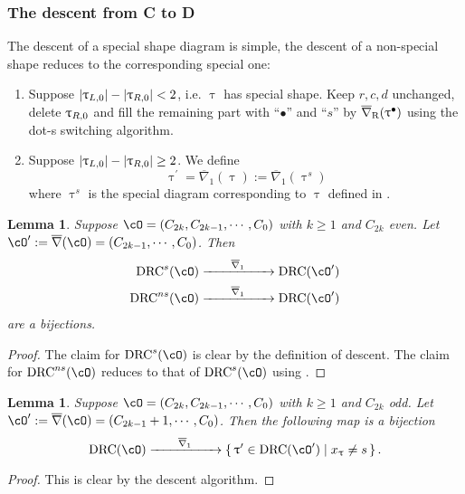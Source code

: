 \documentclass[12pt,a4paper]{amsart}
\def\abs#1{\left|{#1}\right|}
\def\eDD{\overline{\nabla}}
\def\eDDo{\overline{\nabla}_1}
\numberwithin{equation}{section}
\newtheorem{lem}[thm]{Lemma}
\theoremstyle{remark}
\def\drc{\mathrm{DRC}}
\def\drcs{\mathrm{DRC}^{s}}
\def\drcns{\mathrm{DRC}^{ns}}
\def\cOp{\cO^{\prime}}
\def\uptaup{\uptau^{\prime}}
\begin{document}
\subsubsection{The descent from C to D}
The descent of a special shape diagram is simple, the descent of a non-special shape
reduces to the corresponding special one:
\begin{enumerate}[resume*=alg1]
  \item Suppose $\abs{\taulf} - \abs{\taurf} < 2$, i.e. $\uptau$ has special
        shape. Keep $r,c,d$ unchanged, delete $\uptau_{R,0}$ and fill the remaining
        part with ``$\bullet$'' and ``$s$'' by $\DDr(\uptau^{\bullet})$ using
        the dot-s switching algorithm.
  \item Suppose $\abs{\taulf} - \abs{\taurf} \geq 2$. We define
        \[\uptaup=\eDDo(\uptau):=\eDDo(\uptau^{s})\] where $\uptau^{s}$ is the
        special diagram corresponding to $\uptau$ defined in
        .
\end{enumerate}

\begin{lem}\label{lem:ds.CD}
  Suppose $\cO = (C_{2k},C_{2k-1}, \cdots, C_{0})$ with $k\geq 1$ and $C_{2k}$ even.
  Let $\cOp := \eDD(\cO)=(C_{2k-1},\cdots, C_{0})$.
  Then
  \[
    \begin{split}
      \drcs(\cO) &\xrightarrow{\hspace{2em}\eDDo\hspace{2em}} \drc(\cOp) \\
      \drcns(\cO)&
      \xrightarrow{\hspace{2em}\eDDo\hspace{2em}} \drc(\cOp)
    \end{split}
  \]
  are a bijections.
\end{lem}
\begin{proof}
  The claim for $\drcs(\cO)$ is clear by the definition of descent.
  The claim for $\drcns(\cO)$ reduces to that of $\drcs(\cO)$ using .
\end{proof}

\begin{lem}\label{lem:gd.CD}
  Suppose $\cO = (C_{2k},C_{2k-1}, \cdots, C_{0})$ with $k\geq 1$ and $C_{2k}$ odd.
  Let $\cOp := \eDD(\cO)=(C_{2k-1}+1,\cdots, C_{0})$.
  Then the following map is a bijection
  \[
      \drc(\cO) \xrightarrow{\hspace{2em}\eDDo\hspace{2em}} \set{\uptaup\in \drc(\cOp)| x_{\uptau}\neq s}. %
  \]
\end{lem}
\begin{proof}
  This is clear by the descent algorithm.
\end{proof}
\end{document}
